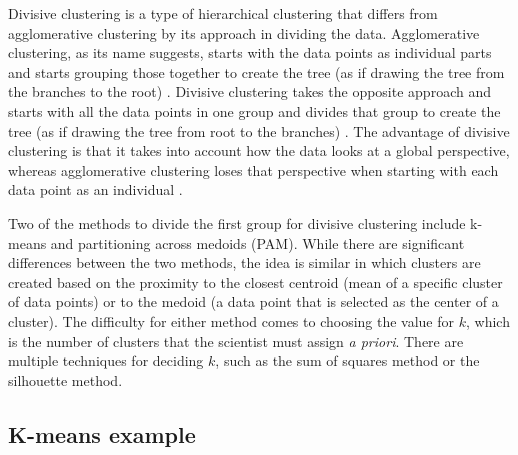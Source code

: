 \documentclass[12pt,openany]{book}
\begin{document}
Divisive clustering is a type of hierarchical clustering that differs
from agglomerative clustering by its approach in dividing the data.
Agglomerative clustering, as its name suggests, starts with the data
points as individual parts and starts grouping those together to create
the tree (as if drawing the tree from the branches to the root)
\citep{cluster}. Divisive clustering takes the opposite approach and
starts with all the data points in one group and divides that group to
create the tree (as if drawing the tree from root to the branches)
\citep{0521865719, cluster}. The advantage of divisive clustering is
that it takes into account how the data looks at a global perspective,
whereas agglomerative clustering loses that perspective when starting
with each data point as an individual \citep{cluster}.

Two of the methods to divide the first group for divisive clustering
include k-means and partitioning across medoids (PAM). While there are
significant differences between the two methods, the idea is similar in
which clusters are created based on the proximity to the closest
centroid (mean of a specific cluster of data points) or to the medoid (a
data point that is selected as the center of a cluster). The difficulty
for either method comes to choosing the value for \(k\), which is the
number of clusters that the scientist must assign \emph{a priori}. There
are multiple techniques for deciding \(k\), such as the sum of squares
method or the silhouette method.

\subsection{K-means example}\label{k-means-example}
\end{document}
